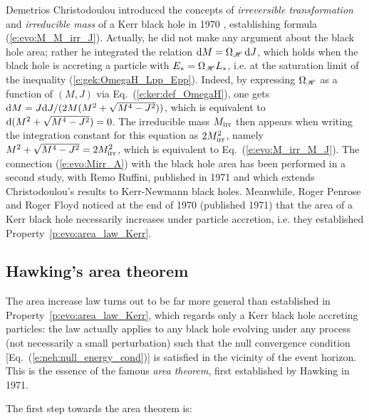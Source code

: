 \begin{hist}
\label{h:evo:irreducible_mass}
Demetrios Christodoulou introduced the
concepts of \emph{irreversible transformation} and \emph{irreducible mass} of a Kerr black
hole in 1970 \cite{Chris70}, establishing formula (\ref{e:evo:M_M_irr_J}).
Actually, he did not make any argument about the black hole area; rather he
integrated the relation $\mathrm{d} M = \Omega_{\mathscr{H}} \, \mathrm{d} J$, which holds when
the black hole is accreting a particle with $E_* = \Omega_{\mathscr{H}} L_*$, i.e.
at the saturation limit of the inequality (\ref{e:gek:OmegaH_Lpp_Epp}). Indeed, by expressing
$\Omega_{\mathscr{H}}$ as a function of $(M,J)$ via Eq.~(\ref{e:ker:def_OmegaH}),
one gets $\mathrm{d} M = J\mathrm{d} J/(2M(M^2 + \sqrt{M^4 - J^2}))$, which is equivalent
to $\mathrm{d}(M^2 + \sqrt{M^4 - J^2}) = 0$.
The irreducible mass $M_{\rm irr}$
then appears when writing the integration constant for this equation as $2 M_{\rm irr}^2$,
namely $M^2 + \sqrt{M^4 - J^2} = 2 M_{\rm irr}^2$, which is equivalent to Eq.~(\ref{e:evo:M_irr_M_J}).
The connection (\ref{e:evo:Mirr_A}) with the black hole area has been
performed in a second study, with Remo Ruffini, published in 1971
\cite{ChrisR71} and which extends Christodoulou's results to Kerr-Newmann
black holes. Meanwhile,
Roger Penrose
and Roger Floyd \cite{PenroF71} noticed at the end of 1970 (published 1971)
that the area of a Kerr black hole necessarily increases under particle accretion, i.e.
they established Property~\ref{p:evo:area_law_Kerr}.
\end{hist}

\subsection{Hawking's area theorem}

The area increase law turns out to be far
more general than established in Property~\ref{p:evo:area_law_Kerr},
which regards only a Kerr black hole accreting particles:
the law actually applies to any black hole evolving under
any process (not necessarily a small perturbation) such that the null convergence condition
[Eq.~(\ref{e:neh:null_energy_cond})]
is satisfied in the vicinity of the event horizon.
This is the essence of the famous \emph{area theorem}, first established
by Hawking in 1971.

The first step towards the area theorem is:

